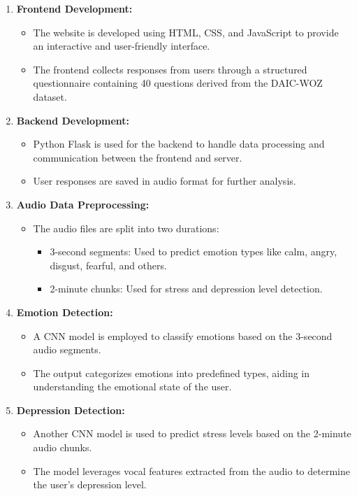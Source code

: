 \begin{enumerate}
    \item \textbf{Frontend Development:}
    \begin{itemize}
        \item The website is developed using HTML, CSS, and JavaScript to provide an interactive and user-friendly interface.
        \item The frontend collects responses from users through a structured questionnaire containing 40 questions derived from the DAIC-WOZ dataset.
    \end{itemize}
    \item \textbf{Backend Development:}
    \begin{itemize}
        \item Python Flask is used for the backend to handle data processing and communication between the frontend and server.
        \item User responses are saved in audio format for further analysis.
    \end{itemize}
    \item \textbf{Audio Data Preprocessing:}
    \begin{itemize}
        \item The audio files are split into two durations:
        \begin{itemize}
            \item 3-second segments: Used to predict emotion types like calm, angry, disgust, fearful, and others.
            \item 2-minute chunks: Used for stress and depression level detection.
        \end{itemize}
    \end{itemize}
    \item \textbf{Emotion Detection:}
    \begin{itemize}
        \item A CNN model is employed to classify emotions based on the 3-second audio segments.
        \item The output categorizes emotions into predefined types, aiding in understanding the emotional state of the user.
    \end{itemize}
    \item \textbf{Depression Detection:}
    \begin{itemize}
        \item Another CNN model is used to predict stress levels based on the 2-minute audio chunks.
        \item The model leverages vocal features extracted from the audio to determine the user's depression level.

\end{itemize}
\end{enumerate}
